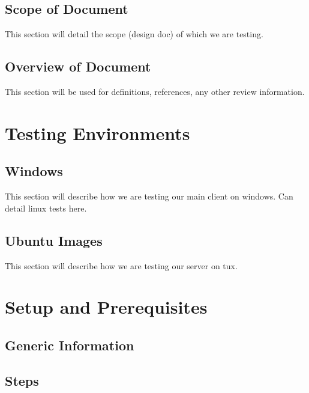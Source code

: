 \documentclass{scrreprt}
\begin{document}
	\section{Scope of Document}
		This section will detail the scope (design doc) of which we are testing.
	\section{Overview of Document}
		This section will be used for definitions, references, any other review information.

\chapter{Testing Environments}
	\section{Windows}
		This section will describe how we are testing our main client on windows. Can detail linux tests here.
	\section{Ubuntu Images}
		This section will describe how we are testing our server on tux.

\chapter{Setup and Prerequisites}
	\section{Generic Information}
	\section{Steps}
\end{document}
